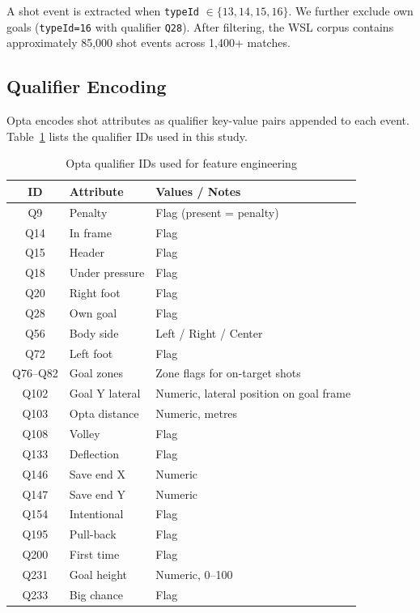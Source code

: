 \documentclass[12pt,a4paper]{article}
\begin{document}
A shot event is extracted when \texttt{typeId} $\in \{13,14,15,16\}$. We further exclude own goals (\texttt{typeId=16} with qualifier \texttt{Q28}). After filtering, the WSL corpus contains approximately 85,000 shot events across 1,400+ matches.

\subsection{Qualifier Encoding}

Opta encodes shot attributes as qualifier key-value pairs appended to each event. Table~\ref{tab:qualifiers} lists the qualifier IDs used in this study.

\begin{table}[H]
\centering
\caption{Opta qualifier IDs used for feature engineering}
\label{tab:qualifiers}
\begin{tabular}{cll}
\toprule
\textbf{ID} & \textbf{Attribute} & \textbf{Values / Notes} \\
\midrule
Q9   & Penalty             & Flag (present = penalty) \\
Q14  & In frame            & Flag \\
Q15  & Header              & Flag \\
Q18  & Under pressure      & Flag \\
Q20  & Right foot          & Flag \\
Q28  & Own goal            & Flag \\
Q56  & Body side           & Left / Right / Center \\
Q72  & Left foot           & Flag \\
Q76--Q82 & Goal zones      & Zone flags for on-target shots \\
Q102 & Goal Y lateral      & Numeric, lateral position on goal frame \\
Q103 & Opta distance       & Numeric, metres \\
Q108 & Volley              & Flag \\
Q133 & Deflection          & Flag \\
Q146 & Save end X          & Numeric \\
Q147 & Save end Y          & Numeric \\
Q154 & Intentional         & Flag \\
Q195 & Pull-back           & Flag \\
Q200 & First time          & Flag \\
Q231 & Goal height         & Numeric, 0--100 \\
Q233 & Big chance          & Flag \\
\bottomrule
\end{tabular}
\end{table}
\end{document}
